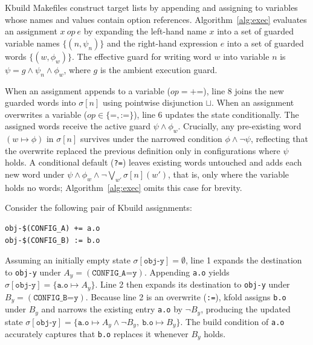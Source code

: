 \documentclass[acmsmall]{acmart}
\newcommand{\tool}{\textsf{kfold}\xspace}
\begin{document}
Kbuild Makefiles construct target lists by appending and assigning to variables whose names and values contain option references.
Algorithm~\ref{alg:exec} evaluates an assignment $x\ \mathit{op}\ e$ by expanding the left-hand name $x$ into a set of guarded variable names $\{(n, \psi_n)\}$ and the right-hand expression $e$ into a set of guarded words $\{(w, \phi_w)\}$.
The effective guard for writing word $w$ into variable $n$ is $\psi = g \land \psi_n \land \phi_w$, where $g$ is the ambient execution guard.

When an assignment appends to a variable ($\mathit{op} = \texttt{+=}$), line 8 joins the new guarded words into $\sigma[n]$ using pointwise disjunction $\sqcup$.
When an assignment overwrites a variable ($\mathit{op} \in \{\texttt{=}, \texttt{:=}\}$), line 6 updates the state conditionally.
The assigned words receive the active guard $\psi \land \phi_w$.
Crucially, any pre-existing word $(w \mapsto \phi)$ in $\sigma[n]$ survives under the narrowed condition $\phi \land \neg\psi$, reflecting that the overwrite replaced the previous definition only in configurations where $\psi$ holds.
A conditional default (\texttt{?=}) leaves existing words untouched and adds each new word under $\psi \land \phi_w \land \neg\bigvee_{w'} \sigma[n](w')$, that is, only where the variable holds no words; Algorithm~\ref{alg:exec} omits this case for brevity.

Consider the following pair of Kbuild assignments:
\begin{lstlisting}[style=kbuild-example]
obj-$(CONFIG_A) += a.o
obj-$(CONFIG_B) := b.o
\end{lstlisting}
Assuming an initially empty state $\sigma[\texttt{obj-y}] = \emptyset$, line 1 expands the destination to \texttt{obj-y} under $A_y = (\texttt{CONFIG\_A=y})$.
Appending \texttt{a.o} yields $\sigma[\texttt{obj-y}] = \{\texttt{a.o} \mapsto A_y\}$.
Line 2 then expands its destination to \texttt{obj-y} under $B_y = (\texttt{CONFIG\_B=y})$.
Because line 2 is an overwrite (\texttt{:=}), \tool assigns \texttt{b.o} under $B_y$ and narrows the existing entry \texttt{a.o} by $\neg B_y$, producing the updated state $\sigma[\texttt{obj-y}] = \{\texttt{a.o} \mapsto A_y \land \neg B_y,\ \texttt{b.o} \mapsto B_y\}$.
The build condition of \texttt{a.o} accurately captures that \texttt{b.o} replaces it whenever $B_y$ holds.
\end{document}
